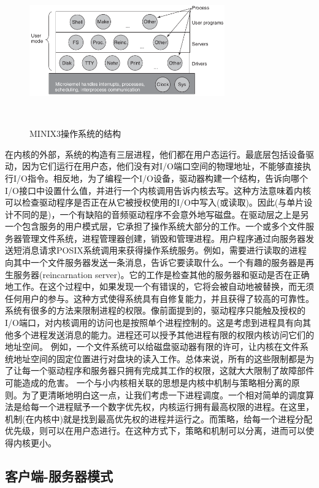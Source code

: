     \begin{figure}[ht]\small
		\centering
		\includegraphics[width=0.75\textwidth]{FIG/1-26.png}
		\caption{MINIX3操作系统的结构}　\label{fig:minix3}
	\end{figure}
	
	在内核的外部，系统的构造有三层进程，他们都在用户态运行。最底层包括设备驱动，因为它们运行在用户态，他们没有对I/O端口空间的物理地址，不能够直接执行I/O指令。相反地，为了编程一个I/O设备，驱动器构建一个结构，告诉向哪个I/O接口中设置什么值，并进行一个内核调用告诉内核去写。这种方法意味着内核可以检查驱动程序是否正在从它被授权使用的I/O中写入(或读取)。因此(与单片设计不同的是)，一个有缺陷的音频驱动程序不会意外地写磁盘。在驱动层之上是另一个包含服务的用户模式层，它承担了操作系统大部分的工作。一个或多个文件服务器管理文件系统，进程管理器创建，销毁和管理进程。用户程序通过向服务器发送短消息请求POSIX系统调用来获得操作系统服务。例如，需要进行读取的进程向其中一个文件服务器发送一条消息，告诉它要读取什么。一个有趣的服务器是再生服务器(reincarnation server)。它的工作是检查其他的服务器和驱动是否在正确地工作。在这个过程中，如果发现一个有错误的，它将会被自动地被替换，而无须任何用户的参与。这种方式使得系统具有自修复能力，并且获得了较高的可靠性。系统有很多的方法来限制进程的权限。像前面提到的，驱动程序只能触及授权的I/O端口，对内核调用的访问也是按照单个进程控制的。这是考虑到进程具有向其他多个进程发送消息的能力。进程还可以授予其他进程有限的权限内核访问它们的地址空间。
	例如，一个文件系统可以给磁盘驱动器有限的许可，让内核在文件系统地址空间的固定位置进行对盘块的读入工作。总体来说，所有的这些限制都是为了让每一个驱动程序和服务器只拥有完成其工作的权限，这就大大限制了故障部件可能造成的危害。
	一个与小内核相关联的思想是内核中机制与策略相分离的原则。为了更清晰地明白这一点，让我们考虑一下进程调度。一个相对简单的调度算法是给每一个进程赋予一个数字优先权，内核运行拥有最高权限的进程。在这里，机制(在内核中)就是找到最高优先权的进程并运行之。而策略，给每一个进程分配优先级，则可以在用户态进行。在这种方式下，策略和机制可以分离，进而可以使得内核更小。
	
	\subsection{客户端-服务器模式}
	
